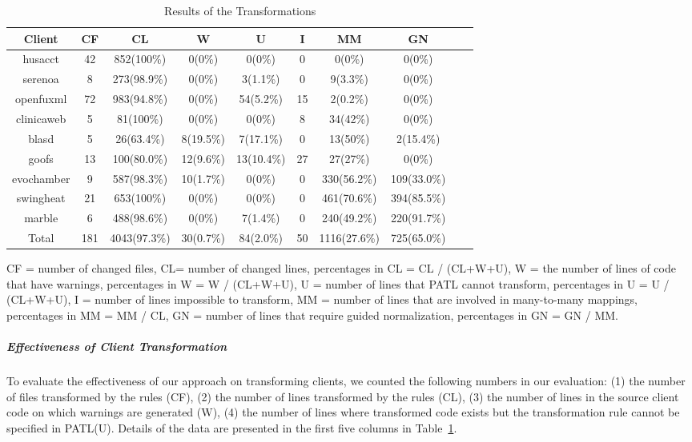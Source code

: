 \documentclass[letterpaper, USenglish]{lipics-v2016}
\newcommand{\PATL}{PATL\xspace}
\theoremstyle{plain}
\begin{document}
\begin{table}
  \centering
  \caption{Results of the Transformations}
  \label{tbl:results}
  \footnotesize
  \begin{tabular}{|c|c|c|c|c|c|c|c|c|c|}
    \hline
    Client & CF & CL & W & U & I & MM & GN\\
    \hline \hline
    husacct     & 42 & 852(100\%) & 0(0\%) & 0(0\%)& 0 & 0(0\%) & 0(0\%)\\
    \hline
    serenoa     & 8 & 273(98.9\%) & 0(0\%) &3(1.1\%)& 0 & 9(3.3\%)& 0(0\%)\\
    \hline
    openfuxml   & 72 & 983(94.8\%) & 0(0\%) &54(5.2\%) &  15  & 2(0.2\%) & 0(0\%)\\
    \hline
    clinicaweb  & 5 & 81(100\%) & 0(0\%) &0(0\%) & 8  & 34(42\%)& 0(0\%)\\
    \hline
    blasd      & 5 & 26(63.4\%) & 8(19.5\%) &7(17.1\%) &0  & 13(50\%) &2(15.4\%)\\
    \hline
    goofs      & 13 & 100(80.0\%) & 12(9.6\%) & 13(10.4\%)  & 27  & 27(27\%) & 0(0\%)\\
    \hline
    evochamber & 9 & 587(98.3\%) & 10(1.7\%) & 0(0\%) & 0  & 330(56.2\%)& 109(33.0\%)\\
    \hline
    swingheat & 21 & 653(100\%) & 0(0\%) & 0(0\%) & 0 & 461(70.6\%) & 394(85.5\%)\\
    \hline
    marble & 6 & 488(98.6\%) & 0(0\%) & 7(1.4\%) & 0  & 240(49.2\%) & 220(91.7\%)\\
    \hline    
    \hline
    Total & 181 & 4043(97.3\%) & 30(0.7\%) & 84(2.0\%) & 50 & 1116(27.6\%) & 725(65.0\%)\\ 
    \hline
  \end{tabular}
  \parbox{\columnwidth}{
    CF = number of changed files, CL= number of changed lines,
    percentages in CL = CL / (CL+W+U), W = the number of lines of code
    that have warnings, percentages in W = W / (CL+W+U), U = number of lines that
    \PATL cannot transform, 
    percentages in U = U / (CL+W+U), I =
    number of lines impossible to transform, 
    MM = number of lines that are involved in many-to-many mappings,
    percentages in MM = MM / CL, GN = number of lines that require
    guided normalization, percentages in GN = GN / MM.}
\vspace{-5pt}
\end{table}

\subparagraph*{Effectiveness of Client Transformation}
To evaluate the effectiveness of our approach on transforming clients,
we counted the following numbers in our evaluation: (1) the number of
files transformed by the rules (CF), (2) the number of lines transformed by
the rules (CL), (3) the number of lines in the source client code on which
warnings are generated (W), (4) the number of lines where transformed code
exists but the transformation rule cannot be specified in \PATL (U).
Details of the data are presented in the first five columns in Table~\ref{tbl:results}.
\end{document}
